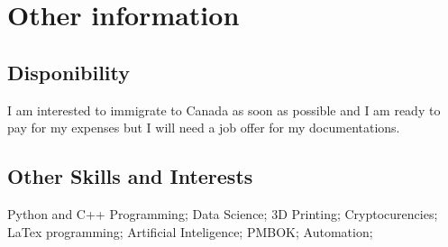 \documentclass[letterpaper]{twentysecondcv} %
\begin{document}

\section{Other information}
\subsection{Disponibility}
I am interested to immigrate to Canada as soon as possible and I am ready to pay for my expenses but I will need a job offer for my documentations.
\subsection{Other Skills and Interests}
Python and C++ Programming; Data Science; 3D Printing; Cryptocurencies; LaTex programming; Artificial Inteligence; PMBOK; Automation; 






\end{document}
